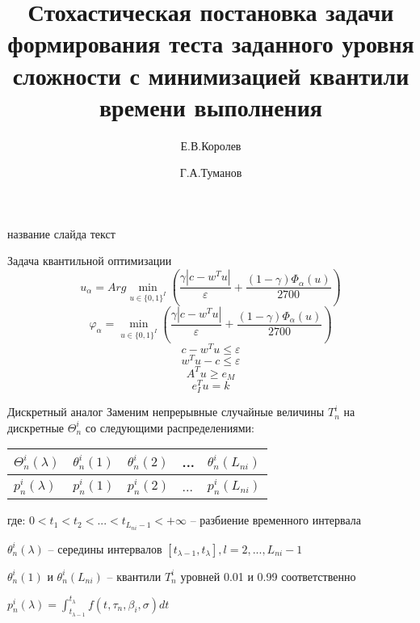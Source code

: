 \documentclass[aspectratio=169]{beamer}
\title[стохастическая задача формирования теста]{Стохастическая постановка задачи формирования теста заданного уровня сложности с минимизацией квантили времени выполнения}
\author[Королев Егор \and Туманов Георгий]{Е.В.Королев \and Г.А.Туманов}
\institute[НИУ МАИ]{Московский авиационный институт (НИУ)}
\begin{document}
    \begin{frame}
        \maketitle
    \end{frame}

    \begin{frame}{название слайда}
        текст\\
    \end{frame}

    \begin{frame}{Задача квантильной оптимизации}
        $$u_\alpha = Arg\min_{u\in\{0, 1\}^I}\left(\frac{\gamma\left|c-w^T u\right|}{\varepsilon} + \frac{(1-\gamma)\Phi_\alpha(u)}{2700}\right)$$
        $$\varphi_\alpha = \min_{u\in\{0, 1\}^I}\left(\frac{\gamma\left|c-w^T u\right|}{\varepsilon} + \frac{(1-\gamma)\Phi_\alpha(u)}{2700}\right)$$
        $$c-w^T u\leq\varepsilon$$
        $$w^T u-c\leq\varepsilon$$
        $$A^T u\geq e_M$$
        $$e_I^T u=k$$
    \end{frame}
    
    \begin{frame}{Дискретный аналог}
        Заменим непрерывные случайные величины $T_n^i$ на дискретные $\Theta_n^i$ со следующими распределениями:\\
        
        \begin{table}[]
		\begin{tabular}{|l||l|l|l|l|}
			\hline
			$\Theta_n^i(\lambda)$ & $\theta_n^i(1)$ & $\theta_n^i(2)$ & ... & $\theta_n^i(L_{ni})$\\ \hline
			$p_n^i(\lambda)$ & $p_n^i(1)$ & $p_n^i(2)$ & ... & $p_n^i(L_{ni})$\\ \hline
		\end{tabular}
		\end{table}
		
		где:\newline
		$0 < t_1 < t_2 < ... < t_{L_{ni}-1} < +\infty$ -- разбиение временного интервала\newline
		
		$\theta_n^i(\lambda)$ -- середины интервалов $[t_{\lambda-1}, t_\lambda], l=2,...,L_{ni}-1$\newline
		
		$\theta_n^i(1)$ и $\theta_n^i(L_{ni})$ -- квантили $T_n^i$ уровней 0.01 и 0.99 соответственно\newline
		
		$p_n^i(\lambda)=\int_{t_{\lambda-1}}^{t_\lambda}f(t, \tau_n, \beta_i, \sigma)dt$
    \end{frame}
    
\end{document}
